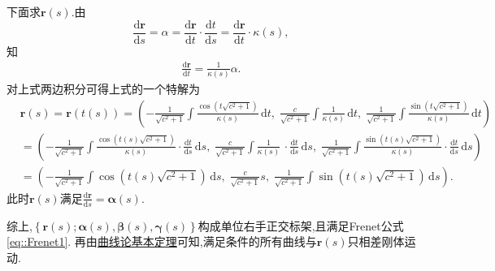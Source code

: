 \documentclass[../../main.tex]{subfiles}%
\begin{document}
\begin{solution}
下面求$\bm{r}(s)$.由
\[
\frac{\mathrm{d}\boldsymbol{r}}{\mathrm{d}s}=\alpha =\frac{\mathrm{d}\boldsymbol{r}}{\mathrm{d}t}\cdot \frac{\mathrm{d}t}{\mathrm{d}s}=\frac{\mathrm{d}\boldsymbol{r}}{\mathrm{d}t}\cdot \kappa \left( s \right) ,
\]
知
\begin{align*}
\frac{\mathrm{d}\bm{r}}{\mathrm{d}t} = \frac{1}{\kappa(s)}\alpha.
\end{align*}
对上式两边积分可得上式的一个特解为
\begin{align*}
&\boldsymbol{r}\left( s \right) =\boldsymbol{r}\left( t\left( s \right) \right) =\left( -\frac{1}{\sqrt{c^2+1}}\int{\frac{\cos \left( t\sqrt{c^2+1} \right)}{\kappa \left( s \right)}\,\mathrm{d}t,\;\frac{c}{\sqrt{c^2+1}}\int{\frac{1}{\kappa \left( s \right)}\,\mathrm{d}t,\;\frac{1}{\sqrt{c^2+1}}\int{\frac{\sin \left( t\sqrt{c^2+1} \right)}{\kappa \left( s \right)}\,\mathrm{d}t}}} \right) 
\\
&=\left( -\frac{1}{\sqrt{c^2+1}}\int{\frac{\cos \left( t\left( s \right) \sqrt{c^2+1} \right)}{\kappa \left( s \right)}\cdot \frac{\mathrm{d}t}{\mathrm{d}s}\,\mathrm{d}s,\;\frac{c}{\sqrt{c^2+1}}\int{\frac{1}{\kappa \left( s \right)}\,\cdot \frac{\mathrm{d}t}{\mathrm{d}s}\,\mathrm{d}s,\;\frac{1}{\sqrt{c^2+1}}\int{\frac{\sin \left( t\left( s \right) \sqrt{c^2+1} \right)}{\kappa \left( s \right)}\cdot \frac{\mathrm{d}t}{\mathrm{d}s}\,\mathrm{d}s}}} \right) 
\\
&=\left( -\frac{1}{\sqrt{c^2+1}}\int{\cos \left( t\left( s \right) \sqrt{c^2+1} \right) \,\mathrm{d}s,\;\frac{c}{\sqrt{c^2+1}}s,\;\frac{1}{\sqrt{c^2+1}}\int{\sin \left( t\left( s \right) \sqrt{c^2+1} \right) \,\mathrm{d}s}} \right) .
\end{align*}
此时$\bm{r}(s)$满足$\frac{\mathrm{d}\bm{r}}{\mathrm{d}s}=\bm{\alpha}(s)$.

综上,$\left\{ \boldsymbol{r}\left( s \right) ;\boldsymbol{\alpha }\left( s \right) ,\boldsymbol{\beta }\left( s \right) ,\boldsymbol{\gamma }\left( s \right) \right\} $构成单位右手正交标架,且满足Frenet公式\eqref{eq::Frenet1}.
再由\hyperref[theorem:微分几何-曲线论基本定理]{曲线论基本定理}可知,满足条件的所有曲线与$\bm{r}(s)$只相差刚体运动.

\end{solution}
\end{document}
